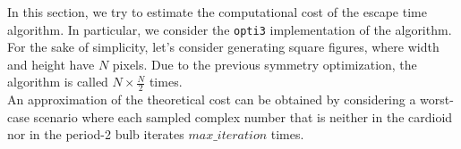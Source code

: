 \documentclass[11pt,a4paper]{article}
\newlength{\figureheight}
\newlength{\figurewidth}
\begin{document}
In this section, we try to estimate the computational cost of the escape time algorithm.
In particular, we consider the \texttt{opti3} implementation of the algorithm.\\
For the sake of simplicity, let's consider generating square figures, where width and height have $N$ pixels.
Due to the previous symmetry optimization, the algorithm is called $N\times\frac{N}{2}$ times.\\[-8pt]

An approximation of the theoretical cost can be obtained by considering a worst-case scenario where each sampled complex number that is neither in the cardioid nor in the period-2 bulb iterates $max\_iteration$ times.\\[-7pt]

\end{document}
